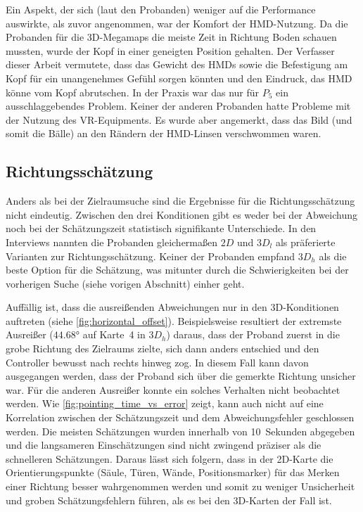 Ein Aspekt, der sich (laut den Probanden) weniger auf die Performance auswirkte, als zuvor angenommen, war der Komfort der HMD-Nutzung.
Da die Probanden für die 3D-Megamaps die meiste Zeit in Richtung Boden schauen mussten, wurde der Kopf in einer geneigten Position gehalten.
Der Verfasser dieser Arbeit vermutete, dass das Gewicht des HMDs sowie die Befestigung am Kopf für ein unangenehmes Gefühl sorgen könnten und den Eindruck, das HMD könne vom Kopf abrutschen.
In der Praxis war das nur für $P_5$ ein ausschlaggebendes Problem.
Keiner der anderen Probanden hatte Probleme mit der Nutzung des VR-Equipments.
Es wurde aber angemerkt, dass das Bild (und somit die Bälle) an den Rändern der HMD-Linsen verschwommen waren.

\subsection{Richtungsschätzung}
Anders als bei der Zielraumsuche sind die Ergebnisse für die Richtungsschätzung nicht eindeutig.
Zwischen den drei Konditionen gibt es weder bei der Abweichung noch bei der Schätzungszeit statistisch signifikante Unterschiede.
In den Interviews nannten die Probanden gleichermaßen $2D$ und $3D_l$ als präferierte Varianten zur Richtungsschätzung. 
Keiner der Probanden empfand $3D_h$ als die beste Option für die Schätzung, was mitunter durch die Schwierigkeiten bei der vorherigen Suche (siehe vorigen Abschnitt) einher geht. 

Auffällig ist, dass die ausreißenden Abweichungen nur in den 3D-Konditionen auftreten (siehe \autoref{fig:horizontal_offset}).
Beispielsweise resultiert der extremste Ausreißer ($\ang{44,68}$ auf Karte~4 in $3D_h$) daraus, dass der Proband zuerst in die grobe Richtung des Zielraums zielte, sich dann anders entschied und den Controller bewusst nach rechts hinweg zog.
In diesem Fall kann davon ausgegangen werden, dass der Proband sich über die gemerkte Richtung unsicher war.
Für die anderen Ausreißer konnte ein solches Verhalten nicht beobachtet werden.
Wie \autoref{fig:pointing_time_vs_error} zeigt, kann auch nicht auf eine Korrelation zwischen der Schätzungszeit und dem Abweichungsfehler geschlossen werden.
Die meisten Schätzungen wurden innerhalb von 10~Sekunden abgegeben und die langsameren Einschätzungen sind nicht zwingend präziser als die schnelleren Schätzungen.
Daraus lässt sich folgern, dass in der 2D-Karte die Orientierungspunkte (Säule, Türen, Wände, Positionsmarker) für das Merken einer Richtung besser wahrgenommen werden und somit zu weniger Unsicherheit und groben Schätzungsfehlern führen, als es bei den 3D-Karten der Fall ist.

